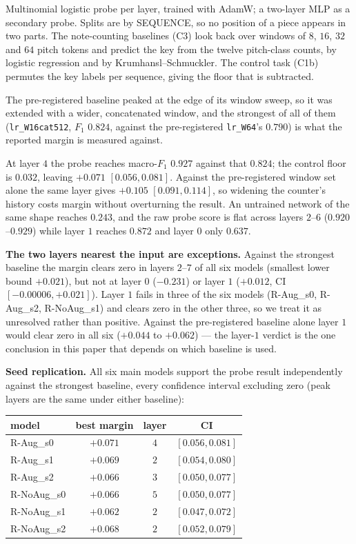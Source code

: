 \documentclass{article}
\begin{document}
Multinomial logistic probe per layer, trained with AdamW; a two-layer MLP as a
secondary probe. Splits are by SEQUENCE, so no position of a piece appears in two
parts. The note-counting baselines (C3) look back over windows of $8$, $16$, $32$ and
$64$ pitch tokens and predict the key from the twelve pitch-class counts, by logistic
regression and by Krumhansl--Schmuckler. The control task (C1b) permutes the key
labels per sequence, giving the floor that is subtracted.

The pre-registered baseline peaked at the edge of its window sweep, so it was extended
with a wider, concatenated window, and the strongest of all of them
(\texttt{lr\_W16cat512}, $F_1$ $0.824$, against the pre-registered
\texttt{lr\_W64}'s $0.790$) is what the reported margin is measured against.

At layer $4$ the probe reaches macro-$F_1$ $0.927$ against that $0.824$; the control
floor is $0.032$, leaving $+0.071$ $[0.056,0.081]$. Against the pre-registered window
set alone the same layer gives $+0.105$ $[0.091,0.114]$, so widening the counter's
history costs margin without overturning the result. An untrained network of the same
shape reaches $0.243$, and the raw probe score is flat across layers $2$--$6$
($0.920$--$0.929$) while layer $1$ reaches $0.872$ and layer $0$ only $0.637$.

\textbf{The two layers nearest the input are exceptions.} Against the strongest
baseline the margin clears zero in layers $2$--$7$ of all six models (smallest lower
bound $+0.021$), but not at layer $0$ ($-0.231$) or layer $1$ ($+0.012$, CI
$[-0.00006, +0.021]$). Layer $1$ fails in three of the six models
(R-Aug\_s0, R-Aug\_s2, R-NoAug\_s1) and clears zero in the other three, so we treat
it as unresolved rather than positive. Against the pre-registered baseline alone layer
$1$ would clear zero in all six ($+0.044$ to $+0.062$) --- the layer-$1$ verdict is the
one conclusion in this paper that depends on which baseline is used.

\textbf{Seed replication.} All six main models support the probe result
independently against the strongest baseline, every confidence interval
excluding zero (peak layers are the same under either baseline):

\begin{center}\footnotesize
\begin{tabular}{@{}lccc@{}}
\toprule
model & best margin & layer & CI\\
\midrule
R-Aug\_s0   & $+0.071$ & $4$ & $[0.056,0.081]$\\
R-Aug\_s1   & $+0.069$ & $2$ & $[0.054,0.080]$\\
R-Aug\_s2   & $+0.066$ & $3$ & $[0.050,0.077]$\\
R-NoAug\_s0 & $+0.066$ & $5$ & $[0.050,0.077]$\\
R-NoAug\_s1 & $+0.062$ & $2$ & $[0.047,0.072]$\\
R-NoAug\_s2 & $+0.068$ & $2$ & $[0.052,0.079]$\\
\bottomrule
\end{tabular}
\end{center}
\end{document}
